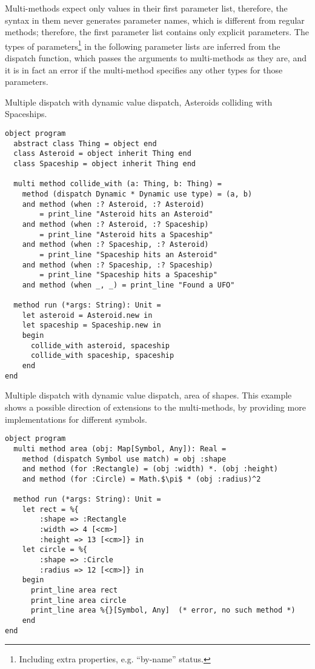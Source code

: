 Multi-methods expect only values in their first parameter list, therefore, the syntax in them never generates parameter names, which is different from regular methods; therefore, the first parameter list contains only explicit parameters. The types of parameters\footnote{Including extra properties, e.g. ``by-name'' status.} in the following parameter lists are inferred from the dispatch function, which passes the arguments to multi-methods as they are, and it is in fact an error if the multi-method specifies any other types for those parameters. 

\example Multiple dispatch with dynamic value dispatch, Asteroids colliding with Spaceships.
\begin{lstlisting}
object program 
  abstract class Thing = object end
  class Asteroid = object inherit Thing end
  class Spaceship = object inherit Thing end
  
  multi method collide_with (a: Thing, b: Thing) =
    method (dispatch Dynamic * Dynamic use type) = (a, b)
    and method (when :? Asteroid, :? Asteroid) 
        = print_line "Asteroid hits an Asteroid"
    and method (when :? Asteroid, :? Spaceship) 
        = print_line "Asteroid hits a Spaceship"
    and method (when :? Spaceship, :? Asteroid) 
        = print_line "Spaceship hits an Asteroid"
    and method (when :? Spaceship, :? Spaceship) 
        = print_line "Spaceship hits a Spaceship"
    and method (when _, _) = print_line "Found a UFO"

  method run (*args: String): Unit =
    let asteroid = Asteroid.new in
    let spaceship = Spaceship.new in
    begin
      collide_with asteroid, spaceship
      collide_with spaceship, spaceship
    end
end
\end{lstlisting}

\example Multiple dispatch with dynamic value dispatch, area of shapes. This example shows a possible direction of extensions to the multi-methods, by providing more implementations for different symbols. 
\begin{lstlisting}
object program
  multi method area (obj: Map[Symbol, Any]): Real =
    method (dispatch Symbol use match) = obj :shape
    and method (for :Rectangle) = (obj :width) *. (obj :height)
    and method (for :Circle) = Math.$\pi$ * (obj :radius)^2

  method run (*args: String): Unit =
    let rect = %{
        :shape => :Rectangle
        :width => 4 [<cm>]
        :height => 13 [<cm>]} in
    let circle = %{
        :shape => :Circle
        :radius => 12 [<cm>]} in
    begin
      print_line area rect 
      print_line area circle
      print_line area %{}[Symbol, Any]  (* error, no such method *)
    end
end
\end{lstlisting}
















